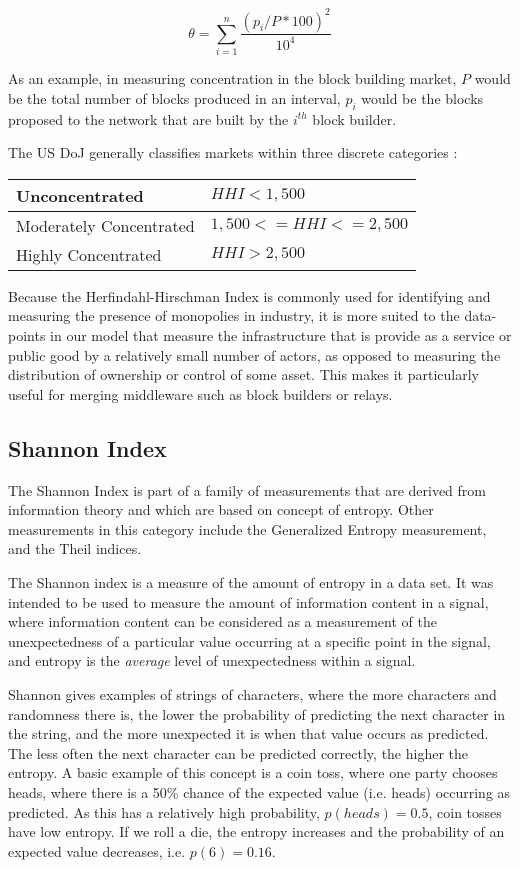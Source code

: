 \documentclass[conference]{IEEEtran}
\begin{document}
\[\theta = \sum_{i=1}^{n} \frac{(p_{i}/P*100)^{2}}{10^{4}}
\]

As an example, in measuring concentration in the block building market, $P$ would be the total number of blocks produced in an interval,  $p_i$ would be the blocks proposed to the network that are built by the $i^{th}$ block builder.

The US DoJ generally classifies markets within three discrete categories \cite{usdoj2015}:

\begin{center}
\begin{tabular}{|l|l|}
\hline
Unconcentrated & $HHI < 1,500$  \\ \hline
Moderately Concentrated & $1,500 <= HHI <= 2,500$ \\ \hline
Highly Concentrated & $HHI > 2,500$ \\ \hline
\end{tabular}
\end{center}

Because the Herfindahl-Hirschman Index is commonly used for identifying and measuring the presence of monopolies in industry, it is more suited to the data-points in our model that measure the infrastructure that is provide as a service or public good by a relatively small number of actors, as opposed to measuring the distribution of ownership or control of some asset.  This makes it particularly useful for merging middleware such as block builders or relays.

\subsection{Shannon Index}

The Shannon Index \cite{shannon1998mathematical} is part of a family of measurements that are derived from information theory and which are based on concept of entropy.  Other measurements in this category include the Generalized Entropy measurement, and the Theil indices.

The Shannon index is a measure of the amount of entropy in a data set.  It was intended to be used to measure the amount of information content in a signal, where information content can be considered as a measurement of the unexpectedness of a particular value occurring at a specific point in the signal, and entropy is the \textit{average} level of unexpectedness within a signal.  

Shannon gives examples of strings of characters, where the more characters and randomness there is, the lower the probability of predicting the next character in the string, and the more unexpected it is when that value occurs as predicted.  The less often the next character can be predicted correctly, the higher the entropy.  A basic example of this concept is a coin toss, where one party chooses heads, where there is a 50\% chance of the expected value (i.e. heads) occurring as predicted.  As this has a relatively high probability, $p(heads) = 0.5$, coin tosses have low entropy. If we roll a die, the entropy increases and the probability of an expected value decreases, i.e. $p(6) = 0.16$.
\end{document}
